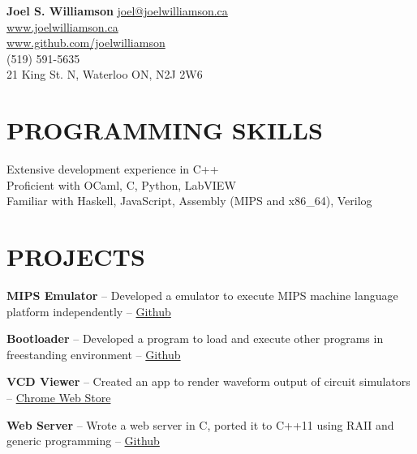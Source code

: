 \documentclass{res}
\begin{document}
 

\begin{center}
{\Large\bf Joel S. Williamson}
{\center \href{mailto:joel@joelwilliamson.ca}{joel@joelwilliamson.ca}\\\url{www.joelwilliamson.ca}\\\url{www.github.com/joelwilliamson}\\
(519) 591-5635\\21 King St. N, Waterloo ON, N2J 2W6 }
\end{center}
\vspace{-1cm}                 
\begin{resume}

\section{PROGRAMMING SKILLS}          
  \vspace{3mm}
    Extensive development experience in C++\\
    Proficient with OCaml, C, Python, LabVIEW\\
    Familiar with Haskell, JavaScript, Assembly (MIPS and x86\_64), Verilog 
 

\section{PROJECTS}
  \vspace{3mm}
    {\bf MIPS Emulator} -- Developed a emulator to execute MIPS machine language platform independently --
    \href{https://github.com/joelwilliamson/MIPS-emulator}{Github}
    \vspace{-3mm}
    
    {\bf Bootloader} -- Developed a program to load and execute other programs in freestanding environment --
    \href{https://github.com/joelwilliamson/AMD64/tree/master/barebones}{Github}
    \vspace{-3mm}
    
    {\bf VCD Viewer} -- Created an app to render waveform output of circuit simulators --
    \href{https://chrome.google.com/webstore/detail/vcd-viewer/fpacodjpmmabkjooobgbpgpmgbfjidkg?hl=en-US}{Chrome Web Store}
    \vspace{-3mm}
    
    {\bf Web Server} -- Wrote a web server in C, ported it to C++11 using RAII and generic programming --
    \href{https://www.github.com/joelwilliamson/JServer}{Github}
    \vspace{-3mm}


\end{resume}
\end{document}
